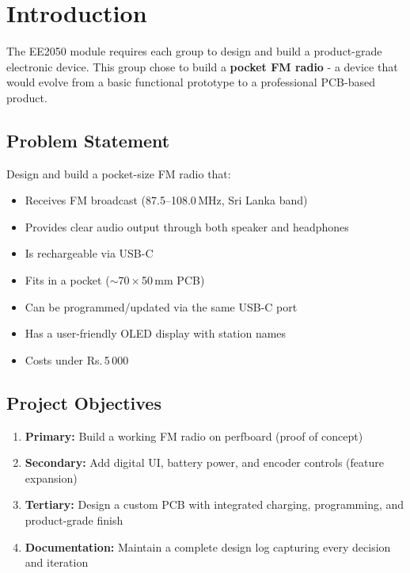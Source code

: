 
\section{Introduction}

The EE2050 module requires each group to design and build a product-grade
electronic device.  This group chose to build a \textbf{pocket FM radio} - a
device that would evolve from a basic functional prototype to a professional
PCB-based product.

\subsection{Problem Statement}

Design and build a pocket-size FM radio that:

\begin{itemize}[leftmargin=1.8em, itemsep=2pt]
  \item Receives FM broadcast (87.5–108.0\,MHz, Sri Lanka band)
  \item Provides clear audio output through both speaker and headphones
  \item Is rechargeable via USB-C
  \item Fits in a pocket ($\sim$70\,$\times$\,50\,mm PCB)
  \item Can be programmed/updated via the same USB-C port
  \item Has a user-friendly OLED display with station names
  \item Costs under Rs.\,5\,000
\end{itemize}

\subsection{Project Objectives}

\begin{enumerate}[leftmargin=2em, itemsep=3pt]
  \item \textbf{Primary:} Build a working FM radio on perfboard (proof of
        concept)
  \item \textbf{Secondary:} Add digital UI, battery power, and encoder
        controls (feature expansion)
  \item \textbf{Tertiary:} Design a custom PCB with integrated charging,
        programming, and product-grade finish
  \item \textbf{Documentation:} Maintain a complete design log capturing
        every decision and iteration
\end{enumerate}

